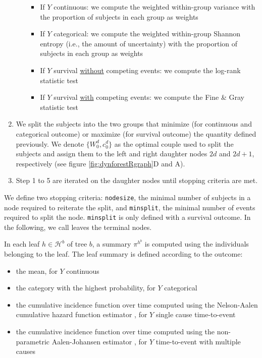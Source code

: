 \begin{enumerate}
\begin{enumerate}
    \begin{itemize}
    \tightlist
    \item
      If \(Y\) continuous: we compute the weighted within-group variance with the proportion of subjects in each group as weights
    \item
      If \(Y\) categorical: we compute the weighted within-group Shannon entropy \citep{shannon_mathematical_1948} (i.e., the amount of uncertainty) with the proportion of subjects in each group as weights
    \item
      If \(Y\) survival \underline{without} competing events: we compute the log-rank statistic test \citep{peto_asymptotically_1972}
    \item
      If \(Y\) survival \underline{with} competing events: we compute the Fine \& Gray statistic test \citep{gray_class_1988}
    \end{itemize}
  \end{enumerate}
\item
  We split the subjects into the two groups that minimize (for continuous and categorical outcome) or maximize (for survival outcome) the quantity defined previously. We denote \(\{W_0^d,c_0^d\}\) as the optimal couple used to split the subjects and assign them to the left and right daughter nodes \(2d\) and \(2d + 1\), respectively (see figure \ref{fig:dynforestRgraph}D and A).
\item
  Step 1 to 5 are iterated on the daughter nodes until stopping criteria are met.
\end{enumerate}

We define two stopping criteria: \texttt{nodesize}, the minimal number of subjects in a node required to reiterate the split, and \texttt{minsplit}, the minimal number of events required to split the node. \texttt{minsplit} is only defined with a survival outcome. In the following, we call leaves the terminal nodes.

In each leaf \(h \in \mathcal{H}^b\) of tree \(b\), a summary \(\pi^{h^b}\) is computed using the individuals belonging to the leaf. The leaf summary is defined according to the outcome:

\begin{itemize}
\tightlist
\item
  the mean, for \(Y\) continuous
\item
  the category with the highest probability, for \(Y\) categorical
\item
  the cumulative incidence function over time computed using the Nelson-Aalen cumulative hazard function estimator \citep{nelson_hazard_1969, aalen_nonparametric_1976}, for \(Y\) single cause time-to-event
\item
  the cumulative incidence function over time computed using the non-parametric Aalen-Johansen estimator \citep{aalen_empirical_1978}, for \(Y\) time-to-event with multiple causes
\end{itemize}

